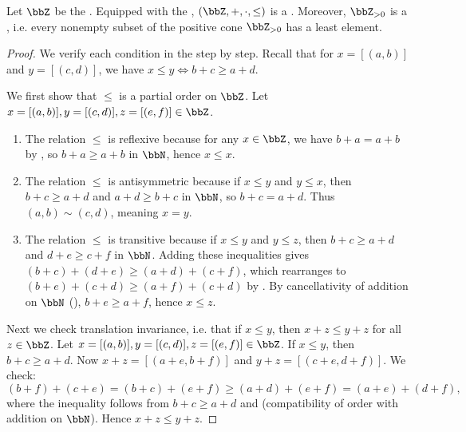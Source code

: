 \begin{proposition} \label{proposition:integers_form_totally_ordered_ring}
Let $\bbZ$ be the . Equipped with the , $(\bbZ, +, \cdot, \le)$ is a . Moreover, $\bbZ_{>0}$ is a , i.e. every nonempty subset of the positive cone $\bbZ_{> 0}$ has a least element.
\end{proposition}

\begin{proof}
We verify each condition in the  step by step. Recall that for $x = [(a,b)]$ and $y = [(c,d)]$, we have $x \leq y \iff b + c \geq a + d$.

We first show that $\leq$ is a partial order on $\bbZ$. Let $x = [(a,b)], y = [(c,d)], z = [(e,f)] \in \bbZ$.
\begin{enumerate}
    \item The relation $\leq$ is reflexive because for any $x \in \bbZ$, we have $b + a = a + b$ by , so $b + a \geq a + b$ in $\bbN$, hence $x \leq x$.

    \item The relation $\leq$ is antisymmetric because if $x \leq y$ and $y \leq x$, then $b + c \geq a + d$ and $a + d \geq b + c$ in $\bbN$, so $b + c = a + d$. Thus $(a,b) \sim (c,d)$, meaning $x = y$.

    \item The relation $\leq$ is transitive because if $x \leq y$ and $y \leq z$, then $b + c \geq a + d$ and $d + e \geq c + f$ in $\bbN$. Adding these inequalities gives $(b + c) + (d + e) \geq (a + d) + (c + f)$, which rearranges to $(b + e) + (c + d) \geq (a + f) + (c + d)$ by . By cancellativity of addition on $\bbN$ (), $b + e \geq a + f$, hence $x \leq z$.
\end{enumerate}

Next we check translation invariance, i.e. that if $x \leq y$, then $x + z \leq y + z$ for all $z \in \bbZ$. Let $x = [(a,b)], y = [(c,d)], z = [(e,f)] \in \bbZ$. If $x \leq y$, then $b + c \geq a + d$. Now $x + z = [(a+e, b+f)]$ and $y + z = [(c+e, d+f)]$. We check:
$$(b+f) + (c+e) = (b+c) + (e+f) \geq (a+d) + (e+f) = (a+e) + (d+f),$$
where the inequality follows from $b + c \geq a + d$ and  (compatibility of order with addition on $\bbN$). Hence $x + z \leq y + z$.


\end{proof}
